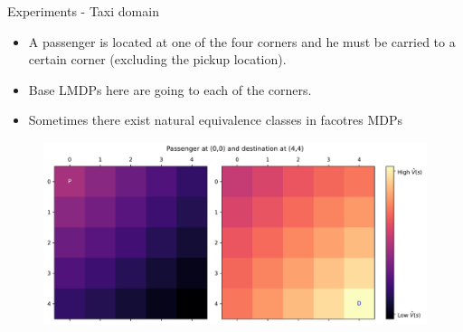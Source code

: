 \documentclass{beamer}
\theoremstyle{mystyle}
\begin{document}
\begin{frame}{Experiments - Taxi domain}
    
    \begin{itemize}
    \item A passenger is located at one of the four corners and he must be carried to a certain corner (excluding the pickup location).
    \item Base LMDPs here are going to each of the corners.
    \item Sometimes there exist natural equivalence classes in facotres MDPs
\end{itemize}

    \begin{figure}[H]
    \centering
    \includegraphics[scale=0.35]{Figures/taxi_dom_VF.png}
    
    \label{fig:vf_taxi}
    \end{figure}

\end{frame}
\end{document}
